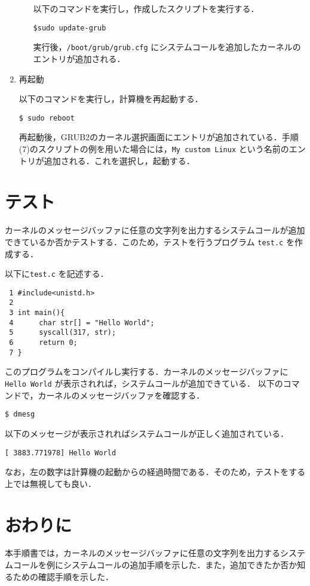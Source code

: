 \documentclass[12pt]{jsarticle}
\begin{document}
\begin{enumerate}
\begin{enumerate}
以下のコマンドを実行し，作成したスクリプトを実行する．
\begin{verbatim}
$sudo update-grub
\end{verbatim}
実行後，\verb|/boot/grub/grub.cfg| にシステムコールを追加したカーネルのエントリが追加される．

\end{enumerate}

\item 再起動

以下のコマンドを実行し，計算機を再起動する．
\begin{verbatim}
$ sudo reboot
\end{verbatim}
再起動後，GRUB2のカーネル選択画面にエントリが追加されている．手順(7)のスクリプトの例を用いた場合には，\verb|My custom Linux| という名前のエントリが追加される．これを選択し，起動する．


\end{enumerate}




\section{テスト}\label{sec:test}

カーネルのメッセージバッファに任意の文字列を出力するシステムコールが追加できているか否かテストする．このため，テストを行うプログラム \verb|test.c| を作成する．

以下に\verb|test.c| を記述する．
\begin{spacing}{0.7}
\begin{verbatim}
 1 #include<unistd.h>
 2
 3 int main(){
 4      char str[] = "Hello World";
 5      syscall(317, str);
 6      return 0;
 7 }
\end{verbatim}
\end{spacing}
このプログラムをコンパイルし実行する．カーネルのメッセージバッファに\verb|Hello World| が表示されれば，システムコールが追加できている．
以下のコマンドで，カーネルのメッセージバッファを確認する．
\begin{verbatim}
$ dmesg
\end{verbatim}
以下のメッセージが表示されればシステムコールが正しく追加されている．
\begin{verbatim}
[ 3883.771978] Hello World
\end{verbatim}
なお，左の数字は計算機の起動からの経過時間である．そのため，テストをする上では無視しても良い．

\section{おわりに}\label{sec:conclusion}
本手順書では，カーネルのメッセージバッファに任意の文字列を出力するシステムコールを例にシステムコールの追加手順を示した．また，追加できたか否か知るための確認手順を示した．
\end{document}

